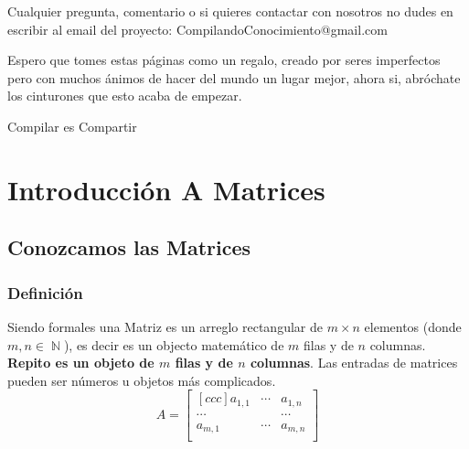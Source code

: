 \documentclass[12pt, fleqn]{report}                             %
\theoremstyle{break}                                            %
\DeclareMathOperator \Naturals     {\mathbb{N}}                 %
\begin{document}
    Cualquier pregunta, comentario o si quieres contactar con nosotros no dudes en escribir al email del proyecto:
    CompilandoConocimiento@gmail.com

    Espero que tomes estas páginas como un regalo, creado por seres imperfectos pero con muchos ánimos de hacer
    del mundo un lugar mejor, ahora si, abróchate los cinturones que esto acaba de empezar.

    \begin{flushright}
        Compilar es Compartir
    \end{flushright}







\part{Introducción A Matrices}
\clearpage




    \chapter{Conozcamos las Matrices}



        \clearpage
        \section{Definición}

            Siendo formales una Matriz es un arreglo rectangular de $m \times n$ elementos 
            (donde $m,n \in \Naturals$), es decir es un objecto matemático de $m$ filas y
            de $n$ columnas. \textbf{Repito es un objeto de $m$ filas y de $n$ columnas}.
            Las entradas de matrices pueden ser números u objetos más complicados.
            \begin{equation*}
                A = 
                \begin{bmatrix}[ccc]
                    a _{1, 1}   & \cdots & a_{1,n}   \\
                    \cdots      &        & \cdots    \\
                    a _{m, 1}   & \cdots & a_{m,n}   \\
                \end{bmatrix}
            \end{equation*}
            
\end{document}
